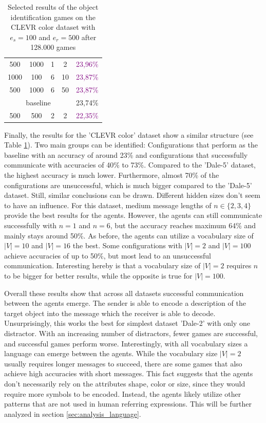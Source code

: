 \begin{table}[ht]
\begin{tabular}{cccc|c}
        {500}                         & {1000}    & {1} & {2}   & \textcolor{purple}{23,96\%}              \\
        {1000}                        & {100}     & {6} & {10}  & \textcolor{purple}{23,87\%}              \\
        {500}                         & {1000}    & {6} & {50}  & \textcolor{purple}{23,87\%}              \\\midrule
        \multicolumn{4}{c|}{baseline} & {23,74\%}                                                          \\\midrule
        {500}                         & {500}     & {2} & {2}   & \textcolor{purple}{22,35\%}              \\
        \bottomrule
    \end{tabular}
    \caption{Selected results of the object identification games on the CLEVR color dataset with $e_s=100$ and $e_r=500$ after 128.000 games}
    \label{tab:results_discriminator_color}
\end{table}

Finally, the results for the 'CLEVR color' dataset show a similar structure (see Table \ref{tab:results_discriminator_color}).
Two main groups can be identified: Configurations that perform as the baseline with an accuracy of around 23\% and configurations that successfully communicate with accuracies of 40\% to 73\%.
Compared to the 'Dale-5' dataset, the highest accuracy is much lower.
Furthermore, almost 70\% of the configurations are unsuccessful, which is much bigger compared to the 'Dale-5' dataset.
Still, similar conclusions can be drawn.
Different hidden sizes don't seem to have an influence.
For this dataset, medium message lengths of $n \in \{2,3,4\}$ provide the best results for the agents.
However, the agents can still communicate successfully with $n=1$ and $n=6$, but the accuracy reaches maximum 64\% and mainly stays around 50\%.
As before, the agents can utilize a vocabulary size of $|V|=10$ and $|V|=16$ the best.
Some configurations with $|V|=2$ and $|V|=100$ achieve accuracies of up to 50\%, but most lead to an unsuccessful communication.
Interesting hereby is that a vocabulary size of $|V|=2$ requires $n$ to be bigger for better results, while the opposite is true for $|V|=100$.

Overall these results show that across all datasets successful communication between the agents emerge.
The sender is able to encode a description of the target object into the message which the receiver is able to decode.
Unsurprisingly, this works the best for simplest dataset 'Dale-2' with only one distractor.
With an increasing number of distractors, fewer games are successful, and successful games perform worse.
Interestingly, with all vocabulary sizes a language can emerge between the agents.
While the vocabulary size $|V|=2$ usually requires longer messages to succeed, there are some games that also achieve high accuracies with short messages.
This fact suggests that the agents don't necessarily rely on the attributes shape, color or size, since they would require more symbols to be encoded.
Instead, the agents likely utilize other patterns that are not used in human referring expressions.
This will be further analyzed in section \ref{sec:analysis_language}.